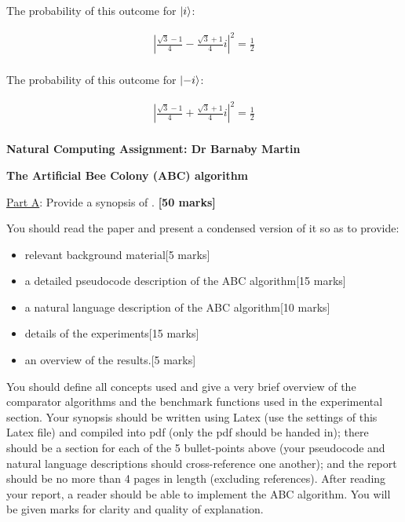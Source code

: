\documentclass{article}
\begin{document}
\begin{enumerate}
\begin{enumerate}
The probability of this outcome for $\ket{i}$:

\begin{align*}
  |\frac{\sqrt{3} - 1}{4} - \frac{\sqrt{3} + 1}{4}i |^2 = \frac{1}{2} \\
\end{align*}

The probability of this outcome for $\ket{-i}$:

\begin{align*}
  |\frac{\sqrt{3} - 1}{4} + \frac{\sqrt{3} + 1}{4}i |^2 = \frac{1}{2} \\
\end{align*}

	\end{enumerate}

\end{enumerate}

\newpage

\begin{center}
\large
{\bf Natural Computing Assignment: Dr Barnaby Martin}\bigskip

{\bf The Artificial Bee Colony (ABC) algorithm}
\normalsize
\end{center}

\noindent\underline{Part A}: Provide a synopsis of \cite{KB07}. \hfill{\bf [50 marks]}\smallskip

\noindent You should read the paper and present a condensed version of it so as to provide:

\begin{itemize}

\item relevant background material\hfill[5 marks]

\item a detailed pseudocode description of the ABC algorithm\hfill[15 marks]

\item a natural language description of the ABC algorithm\hfill[10 marks]

\item details of the experiments\hfill[15 marks]

\item an overview of the results.\hfill[5 marks]

\end{itemize}
You should define all concepts used and give a very brief overview of the comparator algorithms and the benchmark functions used in the experimental section. Your synopsis should be written using Latex (use the settings of this Latex file) and compiled into pdf (only the pdf should be handed in); there should be a section for each of the 5 bullet-points above (your pseudocode and natural language descriptions should cross-reference one another); and the report should be no more than 4 pages in length (excluding references). After reading your report, a reader should be able to implement the ABC algorithm. You will be given marks for clarity and quality of explanation.\bigskip
\end{document}
